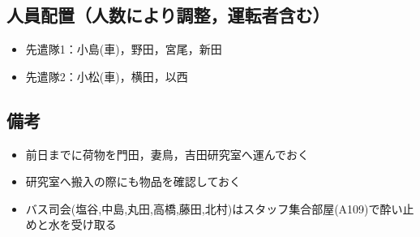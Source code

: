 \subsection{人員配置（人数により調整，運転者含む）}
\begin{itemize}
\item 先遣隊1：小島(車)，野田，宮尾，新田
\item 先遣隊2：小松(車)，横田，以西

\end{itemize}

\subsection{備考}
\begin{itemize}
\item 前日までに荷物を門田，妻鳥，吉田研究室へ運んでおく
\item 研究室へ搬入の際にも物品を確認しておく
\item バス司会(塩谷,中島,丸田,高橋,藤田,北村)はスタッフ集合部屋(A109)で酔い止めと水を受け取る
\end{itemize}


%
